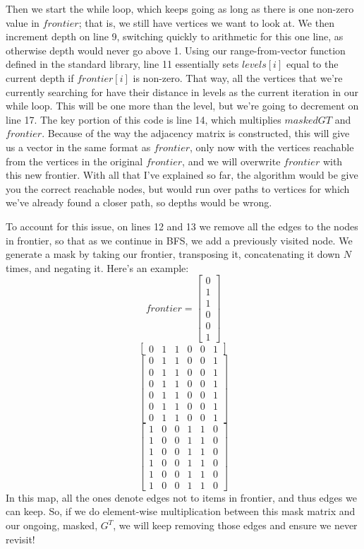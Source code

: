 Then we start the while loop, which keeps going as long as there is one non-zero value in $frontier$; that is, we still have vertices we want to look at.  We then increment depth on line 9, switching quickly to arithmetic for this one line, as otherwise depth would never go above 1.  Using our range-from-vector function defined in the standard library, line 11 essentially sets $levels[i]$ equal to the current depth if $frontier[i]$ is non-zero.  That way, all the vertices that we're currently searching for have their distance in levels as the current iteration in our while loop.  This will be one more than the level, but we're going to decrement on line 17.   The key portion of this code is line 14, which multiplies $maskedGT$ and $frontier$.  Because of the way the adjacency matrix is constructed, this will give us a vector in the same format as $frontier$, only now with the vertices reachable from the vertices in the original $frontier$, and we will overwrite $frontier$ with this new frontier.  With all that I've explained so far, the algorithm would be give you the correct reachable nodes, but would run over paths to vertices for which we've already found a closer path, so depths would be wrong.

To account for this issue, on lines 12 and 13 we remove all the edges to the nodes in frontier, so that as we continue in BFS, we add a previously visited node.  We generate a mask by taking our frontier, transposing it, concatenating it down $N$ times, and negating it.  Here's an example:
$$frontier = \begin{bmatrix}0 \\1\\1\\0\\0\\1\end{bmatrix}$$
$$\begin{bmatrix}0&1&1&0&0&1\end{bmatrix}$$
$$\begin{bmatrix}
0&1&1&0&0&1\\
0&1&1&0&0&1\\
0&1&1&0&0&1\\
0&1&1&0&0&1\\
0&1&1&0&0&1\\
0&1&1&0&0&1
\end{bmatrix}$$
$$\begin{bmatrix}
1&0&0&1&1&0\\
1&0&0&1&1&0\\
1&0&0&1&1&0\\
1&0&0&1&1&0\\
1&0&0&1&1&0\\
1&0&0&1&1&0
\end{bmatrix}$$
In this map, all the ones denote edges not to items in frontier, and thus edges we can keep.  So, if we do element-wise multiplication between this mask matrix and our ongoing, masked, $G^T$, we will keep removing those edges and ensure we never revisit!
